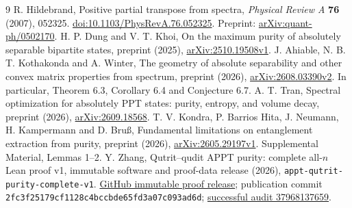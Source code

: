 \documentclass[11pt]{article}
\theoremstyle{remark}\newtheorem{remark}[theorem]{Remark}
\newcommand{\proofcommit}{\texttt{2fc3f25179cf1128c4bccbde65fd3a07c093ad6d}}
\begin{document}
\begin{thebibliography}{9}\small
{} R. Hildebrand, Positive partial transpose from spectra, \emph{Physical Review A} \textbf{76} (2007), 052325. \href{https://doi.org/10.1103/PhysRevA.76.052325}{doi:10.1103/PhysRevA.76.052325}. Preprint: \href{https://arxiv.org/abs/quant-ph/0502170}{arXiv:quant-ph/0502170}.
 H. P. Dung and V. T. Khoi, On the maximum purity of absolutely separable bipartite states, preprint (2025), \href{https://arxiv.org/abs/2510.19508v1}{arXiv:2510.19508v1}.
 J. Ahiable, N. B. T. Kothakonda and A. Winter, The geometry of absolute separability and other convex matrix properties from spectrum, preprint (2026), \href{https://arxiv.org/abs/2608.03390v2}{arXiv:2608.03390v2}. In particular, Theorem 6.3, Corollary 6.4 and Conjecture 6.7.
 A. T. Tran, Spectral optimization for absolutely PPT states: purity, entropy, and volume decay, preprint (2026), \href{https://arxiv.org/abs/2609.18568}{arXiv:2609.18568}.
 T. V. Kondra, P. Barrios Hita, J. Neumann, H. Kampermann and D. Bru{\ss}, Fundamental limitations on entanglement extraction from purity, preprint (2026), \href{https://arxiv.org/abs/2605.29197v1}{arXiv:2605.29197v1}. Supplemental Material, Lemmas 1--2.
 Y. Zhang, Qutrit--qudit APPT purity: complete all-$n$ Lean proof v1, immutable software and proof-data release (2026), \texttt{appt-qutrit-purity-complete-v1}. \href{https://github.com/mxym/math/releases/tag/appt-qutrit-purity-complete-v1}{GitHub immutable proof release}; publication commit \proofcommit; \href{https://github.com/mxym/math/actions/runs/37968137659}{successful audit 37968137659}.
\end{thebibliography}
\end{document}
